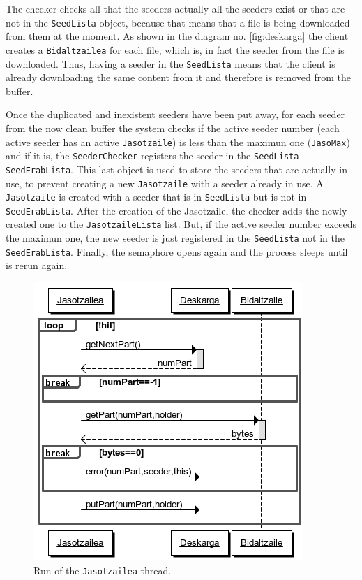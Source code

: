 The checker checks all that the seeders actually all the seeders exist or that are not in the \texttt{SeedLista} object, because that means that a file is being downloaded from them at the moment. As shown in the diagram no. \ref{fig:deskarga} the client creates a \texttt{Bidaltzailea} for each file, which is, in fact the seeder from the file is downloaded. Thus, having a seeder in the \texttt{SeedLista} means that the client is already downloading the same content from it and therefore is removed from the buffer. 

Once the duplicated and inexistent seeders have been put away, for each seeder from the now clean buffer the system checks if the active seeder number (each active seeder has an active \texttt{Jasotzaile}) is less than the maximun one (\texttt{JasoMax}) and if it is, the \texttt{SeederChecker} registers the seeder in the \texttt{SeedLista} \texttt{SeedErabLista}. This last object is used to store the seeders that are actually in use, to prevent creating a new \texttt{Jasotzaile} with a seeder already in use. A \texttt{Jasotzaile} is created with a seeder that is in \texttt{SeedLista} but is not in \texttt{SeedErabLista}. After the creation of the Jasotzaile, the checker adds the newly created one to the \texttt{JasotzaileLista} list. But, if the active seeder number exceeds the maximun one, the new seeder is just registered in the \texttt{SeedLista} not in the \texttt{SeedErabLista}. Finally, the semaphore opens again and the process sleeps until is rerun again.

\begin{figure}
   \centering
   \includegraphics[scale=0.45]{irudiak/jasotzailerun.png}
   \caption{Run of the \texttt{Jasotzailea} thread.}
   \label{fig:jasotzaile}
\end{figure}  


